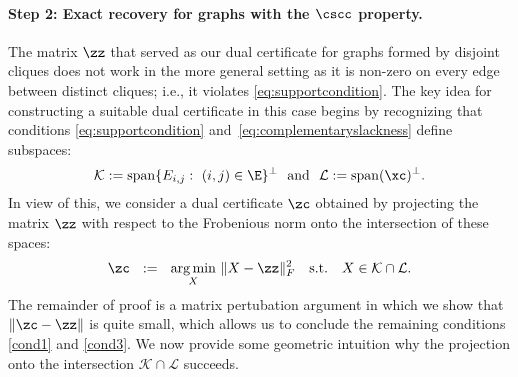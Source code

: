 


\paragraph{Step 2: Exact recovery  for graphs with the $\cscc$ property.}  The matrix $\zz$ that served as our dual certificate for graphs formed by disjoint cliques does not work in the more general setting as it is non-zero on every edge between distinct cliques; i.e., it violates \eqref{eq:supportcondition}.  The key idea for constructing a suitable dual certificate in this case begins by recognizing that conditions \eqref{eq:supportcondition} and~\eqref{eq:complementaryslackness} define subspaces:
$$ \mathcal{K} :={\rm span}\{E_{i,j}: \ (i,j)\in \E \}^\perp  \ \text{ and } \  \mathcal{L} := {\rm span}(\xc)^\perp.
$$
In view of this, we consider a dual certificate $\zc$ obtained by projecting the matrix $\zz$ with respect to the Frobenious norm onto the intersection of these spaces:
$$
\zc ~~:=~~ \underset{X}{\arg \min} ~\| X - \zz \|_F^2 \quad \mathrm{s.t.} \quad X \in \mathcal{K}\cap \mathcal{L}.
$$
The remainder of proof is a matrix pertubation argument in which we show that $\|\zc - \zz \|$ is quite small, which allows us to conclude the remaining conditions \eqref{cond1} and \eqref{cond3}.
We now provide some geometric intuition why  the  projection onto the intersection $\mathcal{K}\cap \mathcal{L}$ succeeds.  

